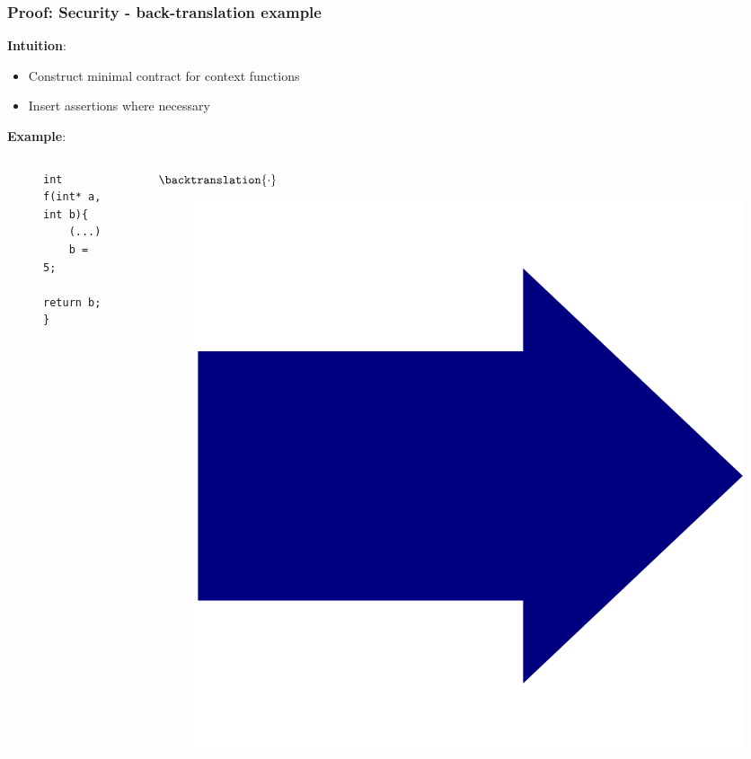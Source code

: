 \documentclass{beamer}
\begin{document}
\begin{frame}[fragile]
\frametitle{Proof: Security - back-translation example}
\textbf{Intuition}:\\
\begin{itemize}
\item Construct minimal contract for context functions\\
\item Insert assertions where necessary\\
\end{itemize}

\textbf{Example}:\\
\begin{columns}
\begin{column}{0.4\textwidth}

\begin{figure}[h]
  \centering
\begin{lstlisting}[style=CStyleNoNum, captionpos = t,title = Target]
int f(int* a, int b){
	(...)
	b = 5; 
	return b;
}
\end{lstlisting}
\end{figure}
	
\end{column}

\begin{column}{0.08\textwidth}

	{\large$\backtranslation{\cdot}$}\\\vspace{-1em}
	\begin{figure}
	\includegraphics[width=0.8\linewidth]{BlueArrow}
	\end{figure}


\end{column}
\end{columns}
\end{frame}
\end{document}
